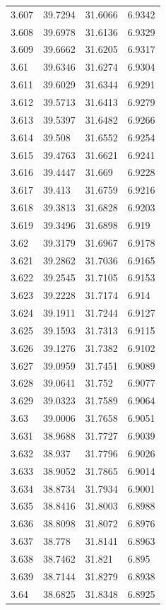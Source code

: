 \begin{tabular}{llll}
3.607 & 39.7294 & 31.6066 & 6.9342 \\
3.608 & 39.6978 & 31.6136 & 6.9329 \\
3.609 & 39.6662 & 31.6205 & 6.9317 \\
3.61 & 39.6346 & 31.6274 & 6.9304 \\
3.611 & 39.6029 & 31.6344 & 6.9291 \\
3.612 & 39.5713 & 31.6413 & 6.9279 \\
3.613 & 39.5397 & 31.6482 & 6.9266 \\
3.614 & 39.508 & 31.6552 & 6.9254 \\
3.615 & 39.4763 & 31.6621 & 6.9241 \\
3.616 & 39.4447 & 31.669 & 6.9228 \\
3.617 & 39.413 & 31.6759 & 6.9216 \\
3.618 & 39.3813 & 31.6828 & 6.9203 \\
3.619 & 39.3496 & 31.6898 & 6.919 \\
3.62 & 39.3179 & 31.6967 & 6.9178 \\
3.621 & 39.2862 & 31.7036 & 6.9165 \\
3.622 & 39.2545 & 31.7105 & 6.9153 \\
3.623 & 39.2228 & 31.7174 & 6.914 \\
3.624 & 39.1911 & 31.7244 & 6.9127 \\
3.625 & 39.1593 & 31.7313 & 6.9115 \\
3.626 & 39.1276 & 31.7382 & 6.9102 \\
3.627 & 39.0959 & 31.7451 & 6.9089 \\
3.628 & 39.0641 & 31.752 & 6.9077 \\
3.629 & 39.0323 & 31.7589 & 6.9064 \\
3.63 & 39.0006 & 31.7658 & 6.9051 \\
3.631 & 38.9688 & 31.7727 & 6.9039 \\
3.632 & 38.937 & 31.7796 & 6.9026 \\
3.633 & 38.9052 & 31.7865 & 6.9014 \\
3.634 & 38.8734 & 31.7934 & 6.9001 \\
3.635 & 38.8416 & 31.8003 & 6.8988 \\
3.636 & 38.8098 & 31.8072 & 6.8976 \\
3.637 & 38.778 & 31.8141 & 6.8963 \\
3.638 & 38.7462 & 31.821 & 6.895 \\
3.639 & 38.7144 & 31.8279 & 6.8938 \\
3.64 & 38.6825 & 31.8348 & 6.8925 \\

\end{tabular}

